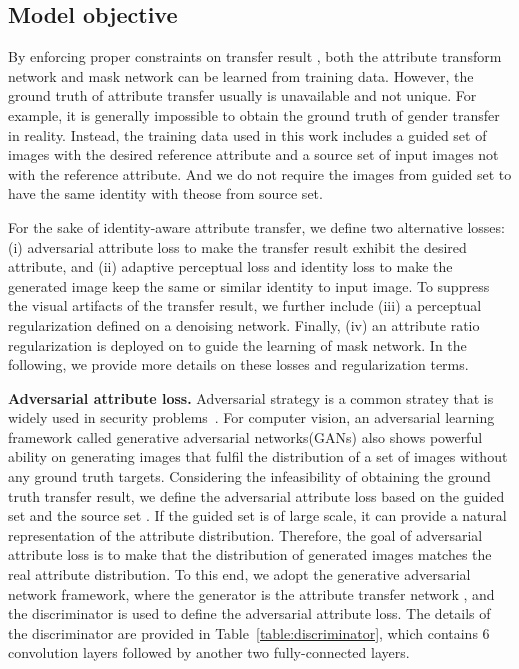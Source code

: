 \documentclass[journal]{IEEEtran}
\begin{document}
\subsection{Model objective}\label{s2_1_1}
By enforcing proper constraints on transfer result , both the attribute transform network and mask network can be learned from training data.
However, the ground truth of attribute transfer usually is unavailable and not unique.
For example, it is generally impossible to obtain the ground truth of gender transfer in reality.
Instead, the training data used in this work includes a guided set  of images with the desired reference attribute and a source set  of input images not with the reference attribute.
And we do not require the images from guided set to have the same identity with theose from source set.




For the sake of identity-aware attribute transfer, we define two alternative losses: (i) adversarial attribute loss to make the transfer result exhibit the desired attribute, and
(ii) adaptive perceptual loss and identity loss to make the generated image keep the same or similar identity to input image.
To suppress the visual artifacts of the transfer result, we further include (iii) a perceptual regularization defined on a denoising network.
Finally, (iv) an attribute ratio regularization is deployed on  to guide the learning of mask network.
In the following, we provide more details on these losses and regularization terms.





\textbf{Adversarial attribute loss.}\quad
Adversarial strategy is a common stratey that is widely used in security problems~\cite{garnaev2016security,zhang2016adversarial}. For computer vision, an adversarial learning framework called generative adversarial networks(GANs) also shows powerful ability on generating images that fulfil the distribution of a set of images without any ground truth targets. 
Considering the infeasibility of obtaining the ground truth transfer result, we define the adversarial attribute loss based on the guided set  and the source set .
If the guided set  is of large scale, it can provide a natural representation of the attribute distribution.
Therefore, the goal of adversarial attribute loss is to make that the distribution of generated images matches the real attribute distribution.
To this end, we adopt the generative adversarial network framework, where the generator is the attribute transfer network ,
and the discriminator  is used to define the adversarial attribute loss. The details of the discriminator are provided in Table~\ref{table:discriminator}, which contains 6 convolution layers followed by another two fully-connected layers.
\end{document}
